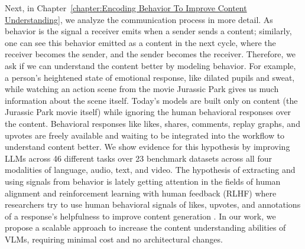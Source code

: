 Next, in Chapter~\ref{chapter:Encoding Behavior To Improve Content Understanding}, we analyze the communication process in more detail. As behavior is the signal a receiver emits when a sender sends a content; similarly, one can see this behavior emitted as a content in the next cycle, where the receiver becomes the sender, and the sender becomes the receiver. Therefore, we ask if we can understand the content better by modeling behavior. For example, a person's heightened state of emotional response, like dilated pupils and sweat, while watching an action scene from the movie Jurassic Park gives us much information about the scene itself. Today's models are built only on content (the Jurassic Park movie itself) while ignoring the human behavioral responses over the content. Behavioral responses like likes, shares, comments, replay graphs, and upvotes are freely available and waiting to be integrated into the workflow to understand content better. We show evidence for this hypothesis by improving LLMs across 46 different tasks over 23 benchmark datasets across all four modalities of language, audio, text, and video. The hypothesis of extracting and using signals from behavior is lately getting attention in the fields of human alignment and reinforcement learning with human feedback (RLHF) where researchers try to use human behavioral signals of likes, upvotes, and annotations of a response's helpfulness to improve content generation \cite{kreutzer2018can,stiennon2020learning,ziegler2019fine,nakano2021webgpt,si2023long,lee2023aligning,wu2023better,khurana2023behavior,khurana-etal-2023-synthesizing}. In our work, we propose a scalable approach to increase the content understanding abilities of VLMs, requiring minimal cost and no architectural changes. 





